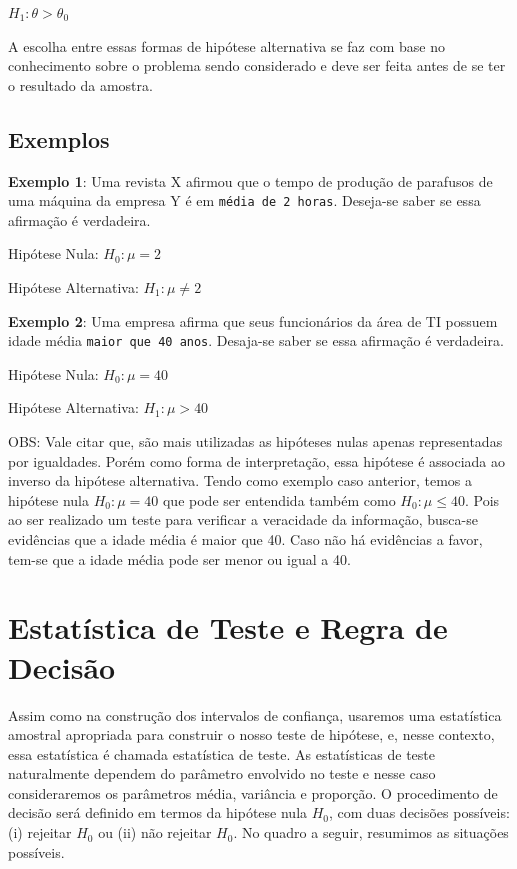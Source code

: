 \documentclass[
  letterpaper,
  DIV=11,
  numbers=noendperiod]{scrreprt}
\begin{document}
\(H_{1} : θ > θ_{0}\)

A escolha entre essas formas de hipótese alternativa se faz com base no
conhecimento sobre o problema sendo considerado e deve ser feita antes
de se ter o resultado da amostra.

\hypertarget{exemplos}{%
\section{Exemplos}\label{exemplos}}

\textbf{Exemplo 1}: Uma revista X afirmou que o tempo de produção de
parafusos de uma máquina da empresa Y é em \texttt{média\ de\ 2\ horas}.
Deseja-se saber se essa afirmação é verdadeira.

Hipótese Nula: \(H_{0} : \mu = 2\)

Hipótese Alternativa: \(H_{1} : \mu\neq 2\)

\textbf{Exemplo 2}: Uma empresa afirma que seus funcionários da área de
TI possuem idade média \texttt{maior\ que\ 40\ anos}. Desaja-se saber se
essa afirmação é verdadeira.

Hipótese Nula: \(H_{0} : \mu = 40\)

Hipótese Alternativa: \(H_{1} : \mu > 40\)

OBS: Vale citar que, são mais utilizadas as hipóteses nulas apenas
representadas por igualdades. Porém como forma de interpretação, essa
hipótese é associada ao inverso da hipótese alternativa. Tendo como
exemplo caso anterior, temos a hipótese nula \(H_{0} : \mu = 40\) que
pode ser entendida também como \(H_{0} : \mu \leq 40\). Pois ao ser
realizado um teste para verificar a veracidade da informação, busca-se
evidências que a idade média é maior que 40. Caso não há evidências a
favor, tem-se que a idade média pode ser menor ou igual a 40.


\hypertarget{estatuxedstica-de-teste-e-regra-de-decisuxe3o}{%
\chapter{Estatística de Teste e Regra de
Decisão}\label{estatuxedstica-de-teste-e-regra-de-decisuxe3o}}

Assim como na construção dos intervalos de confiança, usaremos uma
estatística amostral apropriada para construir o nosso teste de
hipótese, e, nesse contexto, essa estatística é chamada estatística de
teste. As estatísticas de teste naturalmente dependem do parâmetro
envolvido no teste e nesse caso consideraremos os parâmetros média,
variância e proporção. O procedimento de decisão será definido em termos
da hipótese nula \(H_{0}\), com duas decisões possíveis: (i) rejeitar
\(H_{0}\) ou (ii) não rejeitar \(H_{0}\). No quadro a seguir, resumimos
as situações possíveis.
\end{document}
